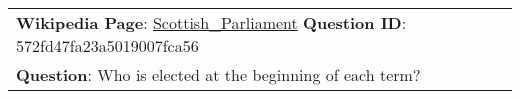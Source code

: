 \begin{figure*}[ht]
{\begin{tabular}{p{}}
            \textbf{Wikipedia Page}: \underline{Scottish\_Parliament} \textbf{Question ID}: 572fd47fa23a5019007fca56                                                                                                                                                                                                                                                                                                                                                                                                                                                                                                                                                                                                                                                                                                                                                                                                                                                                                                                                                                                                                                                                                                                        \\
            \textbf{Question}: Who is elected at the beginning of each term?                                                                                                                                                                                                                                                                                                                                                                                                                                                                                                                                                                                                                                                                                                                                                                                                                                                                                                                                                                                                                                                                                                                                                                \\

\end{tabular}}
\end{figure*}
